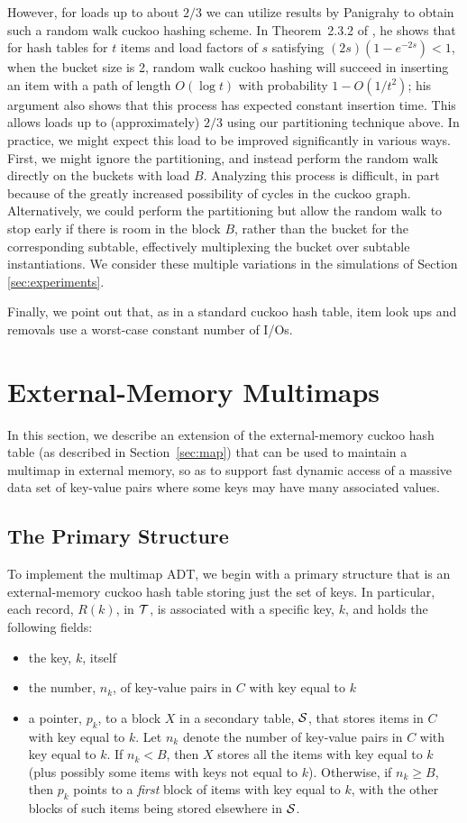 \documentclass[11pt,letterpaper]{article}
\begin{document}
However, for loads up to about $2/3$ we can utilize results by Panigrahy \cite{p-ehltma,p-hss-06} to
obtain such a random
walk cuckoo hashing scheme.  In Theorem~{2.3.2} of \cite{p-hss-06}, he
shows that for hash tables for $t$ items and load factors of $s$
satisfying $(2s)(1-e^{-2s}) < 1$, when the bucket size is 2, random
walk cuckoo hashing will succeed in inserting an item with a path
of length $O(\log t)$ with probability $1-O(1/t^2)$; his argument also
shows that this process has expected constant insertion time.  This
allows loads up to (approximately) $2/3$ using our partitioning technique
above.  In practice, we might expect this load to be improved
significantly in various ways.  First, we might ignore the partitioning,
and instead perform the random walk directly on the buckets with load
$B$.  Analyzing this process is difficult, in part
because of the greatly increased possibility of cycles in the cuckoo
graph.  Alternatively, we could perform the partitioning but allow the
random walk to stop early if there is room in the block $B$, rather
than the bucket for the corresponding subtable, effectively
multiplexing the bucket over subtable instantiations. We consider
these multiple variations in the simulations of Section \ref{sec:experiments}.

Finally, we point out that, as in a standard cuckoo hash table,
item look ups and removals use a worst-case constant number of I/Os.

\section{External-Memory Multimaps}
\label{sec:multimap}
In this section, we describe an extension of the external-memory cuckoo
hash table (as described in Section~\ref{sec:map})
that can be used to maintain a multimap in external
memory, so as to support fast dynamic access of a massive
data set of key-value pairs where some keys may have many associated
values.

\subsection{The Primary Structure}
To implement the multimap ADT, we begin with a primary structure that
is an external-memory cuckoo hash table storing just the set of keys.
In particular,
each record, $R(k)$, in $\cal T$, is associated with a specific key, $k$, and
holds the following fields:
\begin{itemize}
\item
the key, $k$, itself
\item
the number, $n_k$, of key-value pairs in $C$ with key equal to $k$ \item
a pointer, $p_k$, to a block $X$ 
in a secondary table, ${\cal S}$,
that stores items in $C$ with key equal to $k$. 
Let $n_k$ denote the number of key-value pairs in $C$ with key equal to $k$. If $n_k< B$, then $X$
stores all the items with key equal to $k$ (plus possibly some items with
keys not equal to $k$).
Otherwise, if $n_k\ge B$, then $p_k$ points to a \emph{first} block
of items with key equal to $k$, with the other blocks of such items
being stored elsewhere in $\cal S$.
\end{itemize}
\end{document}
